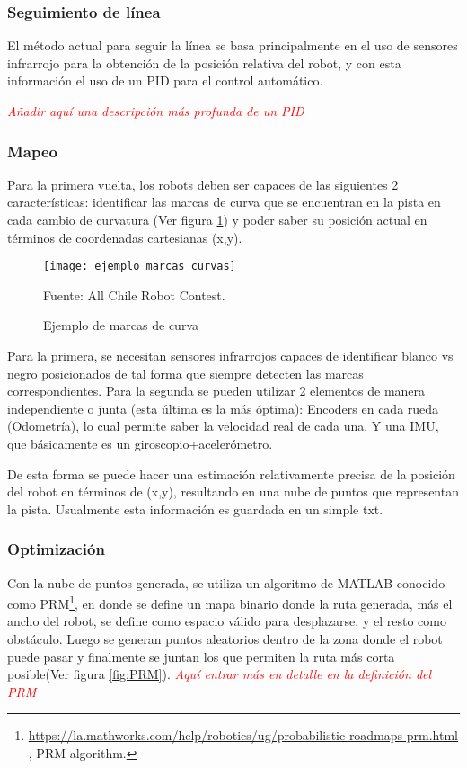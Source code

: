 \subsubsection{Seguimiento de línea}
El método actual para seguir la línea se basa principalmente en el uso de sensores infrarrojo para la obtención de la posición relativa del robot, y con esta información el uso de un PID para el control automático.

\textit{\textcolor{red}{Añadir aquí una descripción más profunda de un PID}}

\subsubsection{Mapeo}
Para la primera vuelta, los robots deben ser capaces de las siguientes 2 características: identificar las marcas de curva que se encuentran en la pista en cada cambio de curvatura (Ver figura \ref{fig:marcaspista}) y poder saber su posición actual en términos de coordenadas cartesianas (x,y).

\begin{figure}[h]
\centering
\texttt{[image: ejemplo\_marcas\_curvas]}
\caption{\label{fig:marcaspista} Ejemplo de marcas de curva} Fuente: All Chile Robot Contest.
\end{figure}

Para la primera, se necesitan sensores infrarrojos capaces de identificar blanco vs negro posicionados de tal forma que siempre detecten las marcas correspondientes. Para la segunda se pueden utilizar 2 elementos de manera independiente o junta (esta última es la más óptima): Encoders en cada rueda (Odometría), lo cual permite saber la velocidad real de cada una. Y una IMU, que básicamente es un giroscopio+acelerómetro.

De esta forma se puede hacer una estimación relativamente precisa de la posición del robot en términos de (x,y), resultando en una nube de puntos que representan la pista. Usualmente esta información es guardada en un simple txt.

\subsubsection{Optimización}
Con la nube de puntos generada, se utiliza un algoritmo de MATLAB conocido como PRM\footnote{\url{https://la.mathworks.com/help/robotics/ug/probabilistic-roadmaps-prm.html} , PRM algorithm.}, en donde se define 
un mapa binario donde la ruta generada, más el ancho del robot, se define como espacio válido para desplazarse, y el resto como obstáculo. Luego se generan puntos aleatorios dentro de la zona donde el robot puede pasar y finalmente se juntan los que permiten la ruta más corta posible(Ver figura \ref{fig:PRM}).
\textit{\textcolor{red}{Aquí entrar más en detalle en la definición del PRM}}

